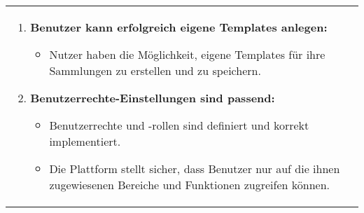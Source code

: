 \begin{tabularx}{\textwidth}{L R}
\begin{enumerate}[left=0pt,label=\arabic*.]
            \item \textbf{Benutzer kann erfolgreich eigene Templates anlegen:}
            \begin{itemize}[label=--]
                \item Nutzer haben die Möglichkeit, eigene Templates für ihre Sammlungen zu erstellen und zu speichern.
            \end{itemize}
            \item \textbf{Benutzerrechte-Einstellungen sind passend:}
            \begin{itemize}[label=--]
                \item Benutzerrechte und -rollen sind definiert und korrekt implementiert.
                \item Die Plattform stellt sicher, dass Benutzer nur auf die ihnen zugewiesenen Bereiche und Funktionen zugreifen können.
            \end{itemize}
        \end{enumerate}
    \end{tabularx}


